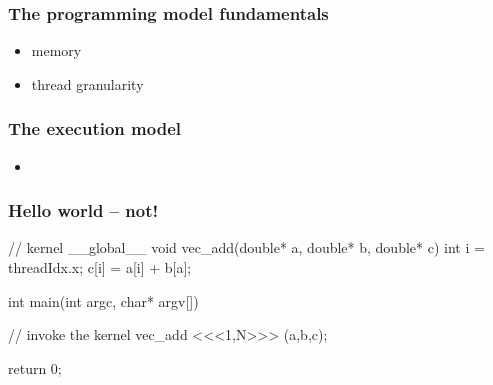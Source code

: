 \begin{frame}[fragile]
%
  \frametitle{The programming model fundamentals}
%
  \begin{itemize}
%
  \item memory
%
  \item thread granularity
%
  \end{itemize}
%
\end{frame}

\begin{frame}[fragile]
%
  \frametitle{The execution model}
%
  \begin{itemize}
%
  \item 
%
  \end{itemize}
%
\end{frame}

\begin{frame}[fragile]
%
  \frametitle{Hello world -- not!}
  \label{slide:hello-world-cuda}
%
  \begin{C}
// kernel
__global__ void vec_add(double* a, double* b, double* c) {
    int i = threadIdx.x;
    c[i] = a[i] + b[a];
}

int main(int argc, char* argv[]) {
  // invoke the kernel
  vec_add <<<1,N>>> (a,b,c);

  return 0;
}
  \end{C}
%
\end{frame}

